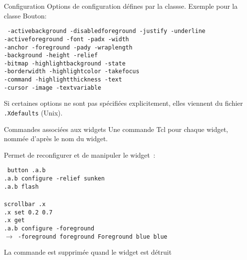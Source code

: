 \documentclass[a4paper,landscape,smooth]{show}
\begin{document}
\begin{tslide}{Configuration}
   \vfill
   Options de configuration défines par la classse. Exemple pour la
   classe Bouton:

   {\tt
      -activebackground -disabledforeground -justify -underline \\
      -activeforeground -font -padx -width \\
      -anchor -foreground -pady -wraplength \\
      -background -height -relief \\
      -bitmap -highlightbackground -state \\
      -borderwidth -highlightcolor -takefocus \\
      -command -highlightthickness -text \\
      -cursor -image -textvariable \\
}

   \vfill
   Si certaines options ne sont pas spécifiées explicitement, elles
   viennent du fichier {\tt .Xdefaults} (Unix).
   \vfill
\end{tslide}


\begin{tslide}{Commandes associées aux widgets}
   \vfill
   Une commande Tcl pour chaque widget, nommée d'après le nom du widget.

   Permet de reconfigurer et de manipuler le widget~:

   {\tt
      button .a.b\\
      .a.b configure -relief sunken\\
      .a.b flash\\
\\
      scrollbar .x\\
      .x set 0.2 0.7\\
      .x get\\

      .a.b configure -foreground\\
      $\rightarrow$ -foreground foreground Foreground blue blue}

   La commande est supprimée quand le widget est détruit
   \vfill
\end{tslide}

\end{document}
